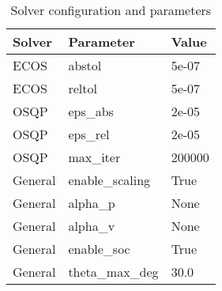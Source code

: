 \begin{table}[t]
\centering
\begin{tabular}{lll}
\toprule
Solver & Parameter & Value \\
\midrule
ECOS & abstol & 5e-07 \\
ECOS & reltol & 5e-07 \\
OSQP & eps_abs & 2e-05 \\
OSQP & eps_rel & 2e-05 \\
OSQP & max_iter & 200000 \\
General & enable_scaling & True \\
General & alpha_p & None \\
General & alpha_v & None \\
General & enable_soc & True \\
General & theta_max_deg & 30.0 \\
\bottomrule
\end{tabular}
\caption{Solver configuration and parameters}
\label{tab:solver_settings}
\end{table}
